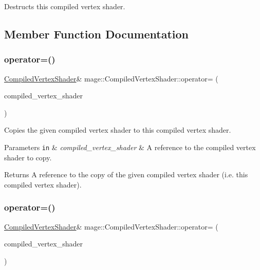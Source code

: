 Destructs this compiled vertex shader. 

\subsection{Member Function Documentation}
\hypertarget{structmage_1_1_compiled_vertex_shader_a9ce8c846d9c29ffd67a19cffd362b709}{}\label{structmage_1_1_compiled_vertex_shader_a9ce8c846d9c29ffd67a19cffd362b709} 
\subsubsection{\texorpdfstring{operator=()}{operator=()}\hspace{0.1cm}{\footnotesize\ttfamily [1/2]}}
{\footnotesize\ttfamily \hyperlink{structmage_1_1_compiled_vertex_shader}{Compiled\+Vertex\+Shader}\& mage\+::\+Compiled\+Vertex\+Shader\+::operator= (\begin{DoxyParamCaption}\item[{const \hyperlink{structmage_1_1_compiled_vertex_shader}{Compiled\+Vertex\+Shader} \&}]{compiled\+\_\+vertex\+\_\+shader }\end{DoxyParamCaption})\hspace{0.3cm}{\ttfamily [delete]}}

Copies the given compiled vertex shader to this compiled vertex shader.


\begin{DoxyParams}[1]{Parameters}
\mbox{\tt in}  & {\em compiled\+\_\+vertex\+\_\+shader} & A reference to the compiled vertex shader to copy. \\
\hline
\end{DoxyParams}
\begin{DoxyReturn}{Returns}
A reference to the copy of the given compiled vertex shader (i.\+e. this compiled vertex shader). 
\end{DoxyReturn}
\hypertarget{structmage_1_1_compiled_vertex_shader_ae42ff3528b8a4b58c3d9f085d0d4573e}{}\label{structmage_1_1_compiled_vertex_shader_ae42ff3528b8a4b58c3d9f085d0d4573e} 
\subsubsection{\texorpdfstring{operator=()}{operator=()}\hspace{0.1cm}{\footnotesize\ttfamily [2/2]}}
{\footnotesize\ttfamily \hyperlink{structmage_1_1_compiled_vertex_shader}{Compiled\+Vertex\+Shader}\& mage\+::\+Compiled\+Vertex\+Shader\+::operator= (\begin{DoxyParamCaption}\item[{\hyperlink{structmage_1_1_compiled_vertex_shader}{Compiled\+Vertex\+Shader} \&\&}]{compiled\+\_\+vertex\+\_\+shader }\end{DoxyParamCaption})\hspace{0.3cm}{\ttfamily [delete]}}

